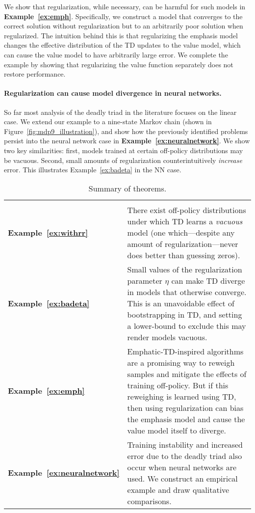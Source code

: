 We show that regularization, while necessary, can be harmful for such models in \textbf{Example~\ref{ex:emph}}. Specifically, we construct a model that converges to the correct solution without regularization but to an arbitrarily poor solution when regularized. The intuition behind this is that regularizing the emphasis model changes the effective distribution of the TD updates to the value model, which can cause the value model to have arbitrarily large error. We complete the example by showing that regularizing the value function separately does not restore performance.

\paragraph{Regularization can cause model divergence in neural networks. }
So far most analysis of the deadly triad in the literature focuses on the linear case. We extend our example to a nine-state Markov chain (shown in Figure~\ref{fig:mdp9_illustration}), and show how the previously identified problems persist into the neural network case in \textbf{Example~\ref{ex:neuralnetwork}}. We show two key similarities: first, models trained at certain off-policy distributions may be vacuous. Second, small amounts of regularization counterintuitively \emph{increase} error. This illustrates Example~\ref{ex:badeta} in the NN case.

\begin{table}
	\centering
	\begin{tabular}{p{} p{}}
		\toprule\toprule
		\\  \textbf{Example~\ref{ex:withrr}} & There exist off-policy distributions under which TD learns a \emph{vacuous} model (one which---despite any amount of regularization---never does better than guessing zeros).
		\\  \textbf{Example~\ref{ex:badeta}} & Small values of the regularization parameter $\eta$ can make TD diverge in models that otherwise converge. This is an unavoidable effect of bootstrapping in TD, and setting a lower-bound to exclude this may render models vacuous.
		\\  \textbf{Example~\ref{ex:emph}} & Emphatic-TD-inspired algorithms are a promising way to reweigh samples and mitigate the effects of training off-policy. But if this reweighing is learned using TD, then using regularization can bias the emphasis model and cause the value model itself to diverge.
		\\  \textbf{Example~\ref{ex:neuralnetwork}} & Training instability and increased error due to the deadly triad also occur when neural networks are used. We construct an empirical example and draw qualitative comparisons.
		\\ \bottomrule \bottomrule
	\end{tabular}
	\vspace{7pt}
	\caption{Summary of theorems. }\label{tab:summarytheorems}
\end{table}

